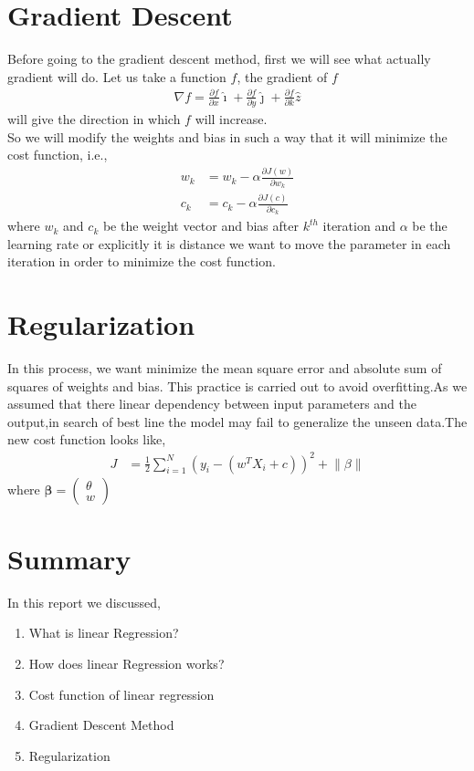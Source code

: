 \documentclass[journal,12pt,onecolumn]{IEEEtran}
\providecommand{\brak}[1]{\ensuremath{\left(#1\right)}}
\theoremstyle{remark}
\providecommand{\norm}[1]{\left\lVert#1\right\rVert}
\newcommand{\myvec}[1]{\ensuremath{\begin{pmatrix}#1\end{pmatrix}}}
\numberwithin{equation}{section}
\let\vec\mathbf
\begin{document}
  \section{Gradient Descent}
   Before going to the gradient descent method, first we will see what actually gradient will do. Let us take a function $f$, the gradient of $f$
                 \begin{align}
			 \nabla f =\frac{\partial f}{\partial x}\hat{\imath} + \frac{\partial f}{\partial y}\hat{\jmath} +\frac{\partial f}{\partial k}\hat{z}
	         \end{align}
		 will give the direction in which $f$ will increase.\\
      So we will modify the weights and bias in such a way that it will minimize the cost function, i.e.,
       \begin{align}
	       w_{k} &= w_{k} -\alpha \frac{\partial J\brak{w}}{\partial w_{k}} \\
	       c_{k} &= c_{k} -\alpha \frac{\partial J\brak{c}}{\partial c_{k}}
       \end{align}
        where $w_{k}$ and $c_{k}$ be the weight vector and bias after $k^{th}$ iteration and $\alpha$ be the learning rate or explicitly it is distance we want to move the parameter in each iteration in order to minimize the cost function. 
  \section{Regularization}
    In this process, we want minimize the mean square error and absolute sum of squares of weights and bias. This practice is carried out to avoid overfitting.As we assumed that there linear dependency between input parameters and the output,in search of best line the model may fail to generalize the unseen data.The new cost function looks like,
           \begin{align}
		   J&= \frac{1}{2}\sum_{i=1}^{N}\brak{y_{i}-\brak{w^TX_{i}+c}}^{2} + \norm{\beta}
           \end{align}
	   where $\vec{\beta} = \myvec{\theta \\ w}$
  \section{Summary}
  In this report we discussed,
    \begin{enumerate}
     \item What is linear Regression?
     \item How does linear Regression works? 
     \item Cost function of linear regression	     
     \item Gradient Descent Method
     \item Regularization
     \end{enumerate}
\end{document}
